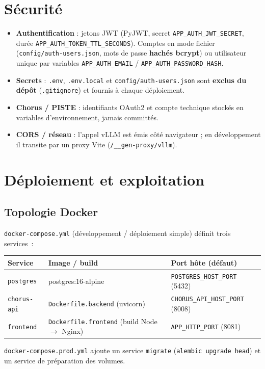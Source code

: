 \documentclass[11pt,a4paper]{article}
\newcommand{\code}[1]{\texttt{\small #1}}
\begin{document}
\section{Sécurité}

\begin{itemize}[nosep]
  \item \textbf{Authentification} : jetons JWT (PyJWT, secret \code{APP\_AUTH\_JWT\_SECRET},
        durée \code{APP\_AUTH\_TOKEN\_TTL\_SECONDS}). Comptes en mode fichier
        (\code{config/auth-users.json}, mots de passe \textbf{hachés bcrypt}) ou
        utilisateur unique par variables \code{APP\_AUTH\_EMAIL} /
        \code{APP\_AUTH\_PASSWORD\_HASH}.
  \item \textbf{Secrets} : \code{.env}, \code{.env.local} et
        \code{config/auth-users.json} sont \textbf{exclus du dépôt}
        (\code{.gitignore}) et fournis à chaque déploiement.
  \item \textbf{Chorus / PISTE} : identifiants OAuth2 et compte technique stockés
        en variables d'environnement, jamais committés.
  \item \textbf{CORS / réseau} : l'appel vLLM est émis côté navigateur ; en
        développement il transite par un proxy Vite (\code{/\_\_gen-proxy/vllm}).
\end{itemize}

\section{Déploiement et exploitation}

\subsection{Topologie Docker}
\code{docker-compose.yml} (développement / déploiement simple) définit trois
services~:
\begin{longtable}{p{3cm} p{5.5cm} p{5.5cm}}
\toprule
\textbf{Service} & \textbf{Image / build} & \textbf{Port hôte (défaut)} \\
\midrule
\endhead
\code{postgres} & postgres:16-alpine & \code{POSTGRES\_HOST\_PORT} (5432) \\
\code{chorus-api} & \code{Dockerfile.backend} (uvicorn) & \code{CHORUS\_API\_HOST\_PORT} (8008) \\
\code{frontend} & \code{Dockerfile.frontend} (build Node $\rightarrow$ Nginx) & \code{APP\_HTTP\_PORT} (8081) \\
\bottomrule
\end{longtable}
\code{docker-compose.prod.yml} ajoute un service \code{migrate}
(\code{alembic upgrade head}) et un service de préparation des volumes.
\end{document}
